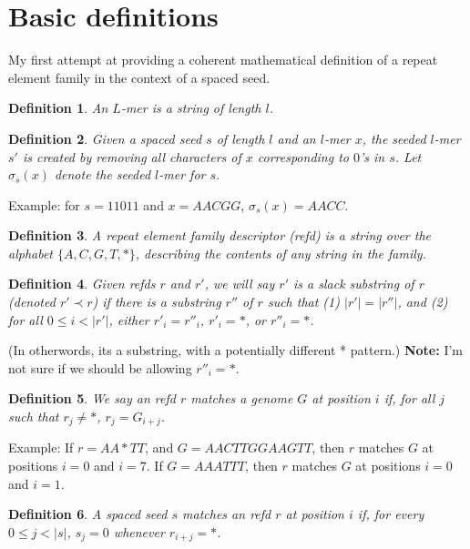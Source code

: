 \documentclass{article}
\newtheorem{definition}{Definition}
\begin{document}
\section{Basic definitions}

My first attempt at providing a coherent mathematical definition of a
repeat element family in the context of a spaced seed.

\begin{definition}
An $L$-mer is a string of length $l$.
\end{definition}

\begin{definition}
Given a spaced seed $s$ of length $l$ and an $l$-mer $x$, the {\it seeded
$l$-mer} $s'$ is created by removing all characters of $x$
corresponding to $0$'s in $s$.  Let $\sigma_s(x)$ denote the seeded
$l$-mer for $s$.
\end{definition}
Example: for $s=11011$ and $x = AACGG$, $\sigma_s(x) = AACC$.

\begin{definition}
  A {\it repeat element family descriptor (refd)} is a
  string over the alphabet $\{A,C,G,T,*\}$, describing the contents
  of any string in the family.
\end{definition}

\begin{definition}
  Given refds $r$ and $r'$, we will say $r'$ is a {\it slack
    substring} of $r$ (denoted $r' \prec r$) if there is a
  substring $r''$ of $r$ such that (1) $|r'|=|r''|$, and (2) for all
  $0 \leq i < |r'|$, either $r'_i = r''_i$, $r'_i = *$, or $r''_i=*$.
\end{definition}
(In otherwords, its a substring, with a potentially different *
pattern.)
{\bf Note: } I'm not sure if we should be allowing $r''_i=*$.

\begin{definition}
  We say an refd $r$ {\it matches} a genome $G$ at position $i$ if, for
  all $j$ such that $r_j \neq *$, $r_j = G_{i+j}$.
\end{definition}

Example: If $r = AA*TT$, and $G = AACTTGGAAGTT$, then $r$ matches $G$
at positions $i=0$ and $i=7$.  If $G=AAATTT$, then $r$ matches $G$ at
positions $i=0$ and $i=1$.


\begin{definition}
  A spaced seed $s$ {\it matches} an refd $r$ at position $i$
  if, for every $0 \leq j < |s|$, $s_j = 0$
  whenever $r_{i+j}=*$.
\end{definition}
\end{document}
